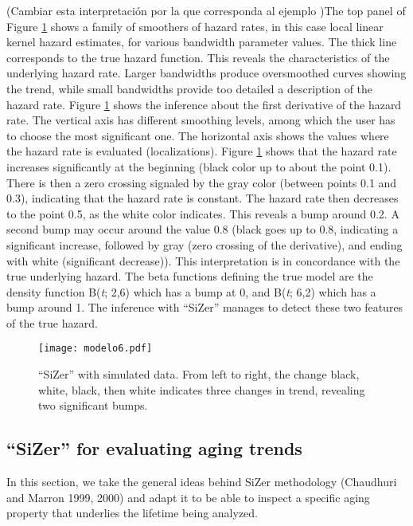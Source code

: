 \documentclass[preprint,12pt]{elsarticle}
\begin{document}
(Cambiar esta interpretación por la que corresponda al ejemplo )The top panel of Figure \ref{Fig:model2} shows a family of smoothers of hazard rates, in this case local linear kernel hazard estimates, for various bandwidth parameter values. The thick line  corresponds to the true hazard function. This reveals the characteristics of the underlying hazard rate. Larger bandwidths produce oversmoothed curves showing the trend, while small bandwidths provide too detailed a description of the hazard rate. 
Figure \ref{Fig:model2} shows the inference about the first derivative of the hazard rate. The vertical axis has different smoothing levels, among which the user has to choose the most significant one.
The horizontal axis shows the values where the hazard  rate is evaluated (localizations).   
Figure \ref{Fig:model2} shows that the hazard rate increases significantly at the beginning (black color up to about the point 0.1). There is then a zero crossing  signaled by the gray color  (between points 0.1 and 0.3), indicating that the hazard rate is constant. The hazard rate then decreases to the point 0.5, as the white color indicates. This reveals a bump around 0.2.  
A second bump may occur around the value 0.8 (black goes up to  0.8, indicating a significant increase, followed by gray (zero crossing of the derivative), and ending with white (significant decrease)).
This interpretation is in concordance with the true underlying hazard. The beta functions defining the true model are
the density function B(\textit{t}; 2,6) which has a  bump at 0, and  B(\textit{t}; 6,2) which has a bump around  1. The inference with ``SiZer'' manages to detect these two features of the true hazard.


\begin{figure}[htb]
\begin{center}
\texttt{[image: modelo6.pdf]}
\caption{``SiZer'' with simulated data. From left to right, the change black, white, black, then white indicates three changes in trend, revealing two significant bumps.}\label{Fig:model2}
\end{center}
\end{figure}




\subsection{``SiZer'' for evaluating aging trends}
\noindent In this section, we take the general ideas behind SiZer methodology (Chaudhuri and Marron 1999, 2000) and adapt it to be able to inspect a specific aging property that underlies the lifetime being analyzed.
\end{document}
